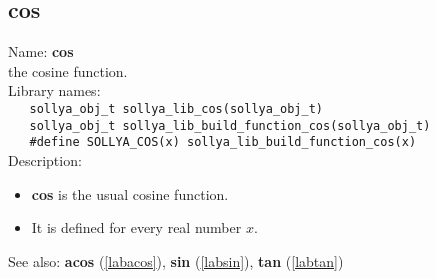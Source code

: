 \subsection{cos}
\label{labcos}
\noindent Name: \textbf{cos}\\
\phantom{aaa}the cosine function.\\[0.2cm]
\noindent Library names:\\
\verb|   sollya_obj_t sollya_lib_cos(sollya_obj_t)|\\
\verb|   sollya_obj_t sollya_lib_build_function_cos(sollya_obj_t)|\\
\verb|   #define SOLLYA_COS(x) sollya_lib_build_function_cos(x)|\\[0.2cm]
\noindent Description: \begin{itemize}

\item \textbf{cos} is the usual cosine function.

\item It is defined for every real number $x$.
\end{itemize}
See also: \textbf{acos} (\ref{labacos}), \textbf{sin} (\ref{labsin}), \textbf{tan} (\ref{labtan})
